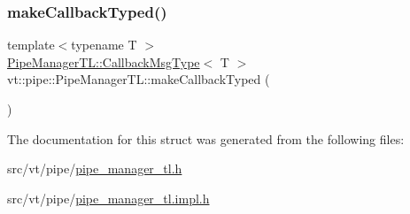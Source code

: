 \subsubsection{\texorpdfstring{make\+Callback\+Typed()}{makeCallbackTyped()}}
{\footnotesize\ttfamily template$<$typename T $>$ \\
\hyperlink{structvt_1_1pipe_1_1_pipe_manager_t_l_af6fc2c17f1729fa06450441b0ee81cb1}{Pipe\+Manager\+T\+L\+::\+Callback\+Msg\+Type}$<$ T $>$ vt\+::pipe\+::\+Pipe\+Manager\+T\+L\+::make\+Callback\+Typed (\begin{DoxyParamCaption}{ }\end{DoxyParamCaption})}



The documentation for this struct was generated from the following files\+:\begin{DoxyCompactItemize}
\item 
src/vt/pipe/\hyperlink{pipe__manager__tl_8h}{pipe\+\_\+manager\+\_\+tl.\+h}\item 
src/vt/pipe/\hyperlink{pipe__manager__tl_8impl_8h}{pipe\+\_\+manager\+\_\+tl.\+impl.\+h}\end{DoxyCompactItemize}
